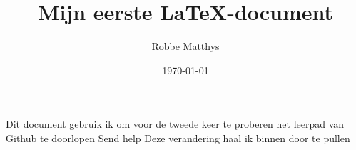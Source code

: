 \documentclass{article}
\title{Mijn eerste \LaTeX -document}
\author{Robbe Matthys}
\date{\today}
\begin{document}
	Dit document gebruik ik om voor de tweede keer te proberen het leerpad van Github te doorlopen
	Send help
	Deze verandering haal ik binnen door te pullen
\end{document}
